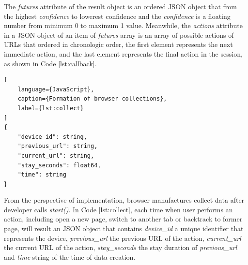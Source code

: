 The \emph{futures} attribute of the result object is an ordered JSON object that from the
highest \emph{confidence} to lowerest {confidence} and the \emph{confidence} is a floating
number from minimum 0 to maximum 1 value. Meanwhile, the \emph{actions} attribute in a 
JSON object of an item of \emph{futures} array is an array of possible actions of URLs that
ordered in chronologic order, the first element represents the next immediate action,
and the last element represents the final action in the session, as shown in Code \ref{lst:callback}.

\begin{lstlisting}[
    language={JavaScript},
    caption={Formation of browser collections},
    label={lst:collect}
]
{
    "device_id": string,
    "previous_url": string,
    "current_url": string,
    "stay_seconds": float64,
    "time": string
}
\end{lstlisting}

From the perspective of implementation, browser manufactures collect data after developer
calls \emph{start()}.
In Code \ref{lst:collect}, each time when user performs an action, including open a new page,
switch to another tab or backtrack to former page, will result an JSON object that contains
\emph{device\_id} a unique identifier that represents the device, \emph{previous\_url} the previous
URL of the action, \emph{current\_url} the current URL of the action, \emph{stay\_seconds}
the stay duration of \emph{previous\_url} and \emph{time} string of the time of data creation.


\cleardoublepage
